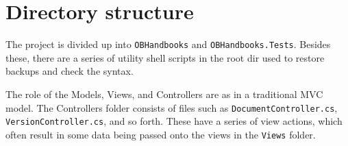\section{Directory structure}
The project is divided up into \texttt{OBHandbooks} and \texttt{OBHandbooks.Tests}.
Besides these, there are a series of utility shell scripts in the root dir used to restore backups and check the syntax.

The role of the Models, Views, and Controllers are as in a traditional MVC model.
The Controllers folder consists of files such as \texttt{DocumentController.cs}, \texttt{VersionController.cs}, and so forth.
These have a series of view actions, which often result in some data being passed onto the views in the \texttt{Views} folder.

